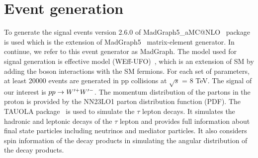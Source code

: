 \section{Event generation}\label{sec:simulation}
To generate the signal events version 2.6.0 of   MadGraph5\_aMC@NLO~\cite{Alwall:2014hca} package is used which is the extension of MadGraph5~\cite{Alwall:2011uj} matrix-element generator. In continue, we refer to this event generator  as MadGraph.
The model used for signal generation is \wprime effective model (WEff-UFO)~\cite{Sullivan:2002jt}, which  is an extension of SM by adding the \wprime boson interactions with the SM fermions.
For each set of parameters, at least 20000 events are generated in pp collisions at $\sqrt{s}$ = 8 TeV. The signal of our interest is $ pp\rightarrow W^{\prime+} W^{\prime-}$. The momentum distribution of the partons in the proton is provided by the NN23LO1 \cite{Ball:2013hta} parton distribution function (PDF). The TAUOLA package~\cite{Davidson:2010rw} is used to simulate the $\tau$ lepton decays. It simulates the hadronic and leptonic decays of the $\tau$ lepton and provides full information about final state particles including neutrinos and mediator particles. It also considers spin information of the decay products in simulating the angular distribution of the decay products.

